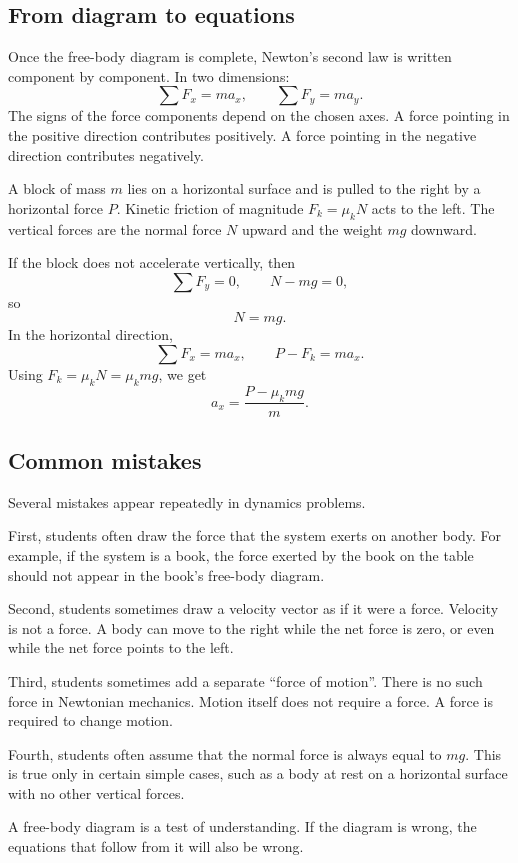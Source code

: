 \subsection{From diagram to equations}

Once the free-body diagram is complete, Newton's second law is written component by component. In two dimensions:
\[
\sum F_x=ma_x,
\qquad
\sum F_y=ma_y.
\]
The signs of the force components depend on the chosen axes. A force pointing in the positive direction contributes positively. A force pointing in the negative direction contributes negatively.

\begin{examplebox}
A block of mass \(m\) lies on a horizontal surface and is pulled to the right by a horizontal force \(P\). Kinetic friction of magnitude \(F_k=\mu_k N\) acts to the left. The vertical forces are the normal force \(N\) upward and the weight \(mg\) downward.

If the block does not accelerate vertically, then
\[
\sum F_y=0,
\qquad
N-mg=0,
\]
so
\[
N=mg.
\]
In the horizontal direction,
\[
\sum F_x=ma_x,
\qquad
P-F_k=ma_x.
\]
Using \(F_k=\mu_k N=\mu_k mg\), we get
\[
a_x=\frac{P-\mu_k mg}{m}.
\]
\end{examplebox}

\subsection{Common mistakes}

Several mistakes appear repeatedly in dynamics problems.

First, students often draw the force that the system exerts on another body. For example, if the system is a book, the force exerted by the book on the table should not appear in the book's free-body diagram.

Second, students sometimes draw a velocity vector as if it were a force. Velocity is not a force. A body can move to the right while the net force is zero, or even while the net force points to the left.

Third, students sometimes add a separate ``force of motion''. There is no such force in Newtonian mechanics. Motion itself does not require a force. A force is required to change motion.

Fourth, students often assume that the normal force is always equal to \(mg\). This is true only in certain simple cases, such as a body at rest on a horizontal surface with no other vertical forces.

\begin{remarkbox}
A free-body diagram is a test of understanding. If the diagram is wrong, the equations that follow from it will also be wrong.
\end{remarkbox}
